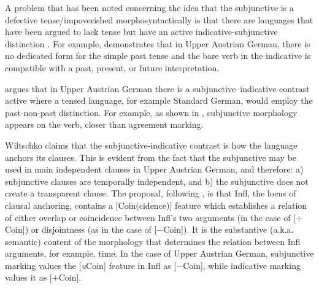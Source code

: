 \documentclass[output=paper,
modfonts,
newtxmath,
hidelinks,
]{langscibook}
\begin{document}
A problem that has been noted concerning the idea that the subjunctive is a defective tense/impoverished morphosyntactically is that there are languages that have been argued to lack tense but have an active indicative-subjunctive distinction \citep{Wiltschko}. For example, \citet{Wiltschko} demonstrates that in Upper Austrian German, there is no dedicated form for the simple past tense and the bare verb in the indicative is compatible with a past, present, or future interpretation.

\ea \label{ex19}
	\z
\z

\noindent \citet{Wiltschko} argues that in Upper Austrian German there is a subjunctive--indicative contrast active where a tensed language, for example Standard German, would employ the past-non-past distinction. For example, as shown in , subjunctive morphology appears on the verb, closer than agreement marking.

\ea \label{ex20}
	\z
\z

\noindent Wiltschko claims that the subjunctive-indicative contrast is how the language anchors its clauses. This is evident from the fact that the subjunctive may be used in main independent clauses in Upper Austrian German, and therefore: a) subjunctive clauses are temporally independent, and b) the subjunctive does not create a transparent clause. The proposal, following \citet{RitterWiltschko2005,RitterWiltschko2009}, is that Infl, the locus of clausal anchoring, contains a [Coin(cidence)] feature which establishes a relation of either overlap or coincidence between Infl’s two arguments (in the case of [$+$Coin]) or disjointness (as in the case of [$-$Coin]). It is the substantive (a.k.a. semantic) content of the morphology that determines the relation between Infl arguments, for example, time. In the case of Upper Austrian German, subjunctive marking values the [\textit{u}Coin] feature in Infl as [$-$Coin], while indicative marking values it as [$+$Coin].\largerpage
\end{document}
